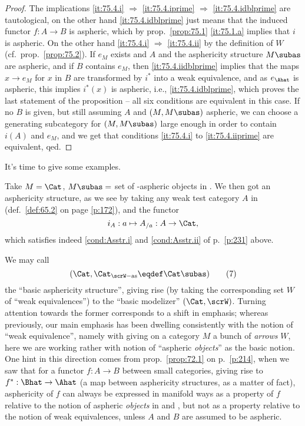 \begin{proof}
  The implications \ref{it:75.4.i} $\Rightarrow$ \ref{it:75.4.iprime}
  $\Rightarrow$ \ref{it:75.4.idblprime} are tautological, on the other
  hand \ref{it:75.4.idblprime} just means that the induced functor $f:
  A\to B$ is aspheric, which by prop.\ \ref{prop:75.1} \ref{it:75.1.a}
  implies that $i$ is aspheric. On the other hand \ref{it:75.4.i}
  $\Rightarrow$ \ref{it:75.4.ii} by the definition of $W$ (cf.\ prop.\
  \ref{prop:75.2}). If $e_M$ exists and $A$ and the asphericity
  structure $M\subas$ are aspheric, and if $B$ contains $e_M$, then
  \ref{it:75.4.iidblprime} implies that the maps $x\to e_M$ for $x$ in
  $B$ are transformed by $i^*$ into a weak equivalence, and as
  $e_\Ahat$ is aspheric, this implies $i^*(x)$ is aspheric,
  i.e., \ref{it:75.4.idblprime}, which proves the last
  statement of the proposition -- all six conditions are
  equivalent in this case. If no $B$ is given, but still assuming $A$
  and $(M,M\subas)$ aspheric, we can choose a generating subcategory
  for $(M,M\subas)$ large enough in order to contain $i(A)$ and $e_M$,
  and we get that conditions \ref{it:75.4.i} to \ref{it:75.4.iiprime}
  are equivalent, qed.
\end{proof}

%
\label{sec:76}%
It's time to give some examples.

\enspace
Take $M=\Cat$, $M\subas=$ set of \scrW-aspheric objects in \Cat. We
then got an asphericity structure, as we see by taking any weak test
category $A$ in \Cat{} (def.\ \ref{def:65.2} on page \ref{p:172}), and
the functor
\[i_A: a\mapsto A_{/a} : A \to\Cat,\]
which satisfies indeed \ref{cond:Asstr.i} and \ref{cond:Asstr.ii} of
p.\ \ref{p:231} above.

We may call
\begin{equation}
  \label{eq:76.7}
  (\Cat, \Cat_{\scrW\mathrm{-as}} \eqdef \Cat\subas)\tag{7}
\end{equation}
the ``basic asphericity structure'', giving rise (by taking the
corresponding set $W$ of ``weak equivalences'') to the ``basic
modelizer'' $(\Cat,\scrW)$. Turning attention towards the former
corresponds to a shift in emphasis; whereas previously, our main
emphasis has been dwelling consistently with the notion of ``weak
equivalence'', namely with giving on a category $M$ a bunch of
\emph{arrows} $W$, here we are working rather with notion of
``aspheric \emph{objects}'' as the basic notion. One hint in this
direction comes from prop.\ \ref{prop:72.1} on p.\ \ref{p:214}, when
we saw that for a functor $f:A\to B$ between small categories, giving
rise to $f^*:\Bhat\to\Ahat$ (a map between asphericity structures, as
a matter of fact), asphericity of $f$ can always be expressed in
manifold ways as a property of $f$ relative to the notion of aspheric
\emph{objects} in \Ahat{} and \Bhat, but not as a property relative to
the notion of weak equivalences, unless $A$ and $B$ are assumed to be
aspheric.


